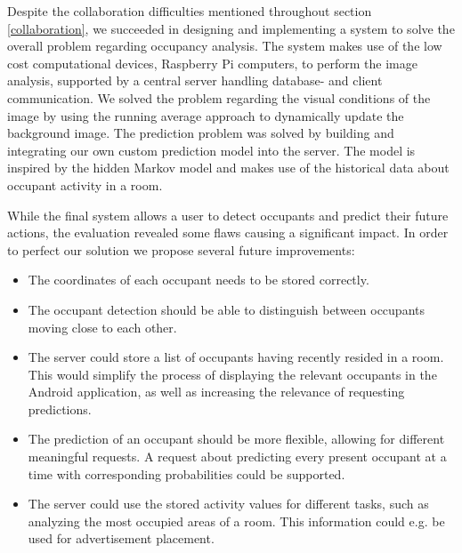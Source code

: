 Despite the collaboration difficulties mentioned throughout section \ref{collaboration}, we succeeded in designing and implementing a system to solve the overall problem regarding occupancy analysis. The system makes use of the low cost computational devices, Raspberry Pi computers, to perform the image analysis, supported by a central server handling database- and client communication. We solved the problem regarding the visual conditions of the image by using the running average approach to dynamically update the background image. The prediction problem was solved by building and integrating our own custom prediction model into the server. The model is inspired by the hidden Markov model and makes use of the historical data about occupant activity in a room.

While the final system allows a user to detect occupants and predict their future actions, the evaluation revealed some flaws causing a significant impact. In order to perfect our solution we propose several future improvements: 
\begin{itemize}
\item The coordinates of each occupant needs to be stored correctly.
\item The occupant detection should be able to distinguish between occupants moving close to each other.
\item The server could store a list of occupants having recently resided in a room. This would simplify the process of displaying the relevant occupants in the Android application, as well as increasing the relevance of requesting predictions.
\item The prediction of an occupant should be more flexible, allowing for different meaningful requests. A request about predicting every present occupant at a time with corresponding probabilities could be supported. 
\item The server could use the stored activity values for different tasks, such as analyzing the most occupied areas of a room. This information could e.g. be used for advertisement placement.
\end{itemize}